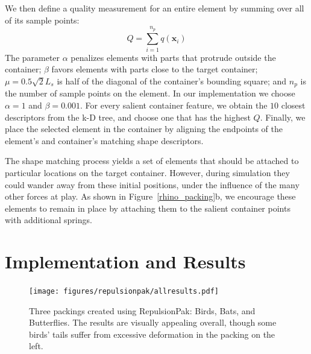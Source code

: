 We then define a quality measurement for an entire element by summing over
all of its sample points:
\begin{equation}
Q = \sum_{i = 1}^{n_p} q(\bm{x}_i)
\end{equation}
The parameter $\alpha$ penalizes elements with parts that protrude outside
the container; $\beta$ favors elements with parts close to the target container; 
$\mu = 0.5 \sqrt{2}L_{s}$ is half of the diagonal of the container's
bounding square; and $n_p$ is the number of sample points on the element.
In our implementation we choose $\alpha = 1$ and $\beta = 0.001$.
For every salient container feature, we obtain the $10$ closest descriptors from the k-D tree, and choose one that has the highest $Q$.
Finally, we place the selected element in the container by 
aligning the endpoints of the element's and container's matching shape 
descriptors.

The shape matching process yields a set of elements that should be attached
to particular locations on the target container.  However, during simulation
they could wander away from these initial positions, under the influence of
the many other forces at play.  As shown in Figure~\ref{rhino_packing}b, we
encourage these elements to remain in place by attaching them to the salient
container points with additional springs.

\section{Implementation and Results}
\label{repulsionpak_results}



\begin{figure}
\centering
\texttt{[image: figures/repulsionpak/allresults.pdf]} 
\caption[Three packings created using RepulsionPak: Birds, Bats, and Butterflies]
{\label{three_packings} Three packings created using RepulsionPak: \newline Birds, Bats, and Butterflies. The results are visually appealing overall,
though some birds' tails suffer from excessive deformation in
the packing on the left.}
\end{figure}

